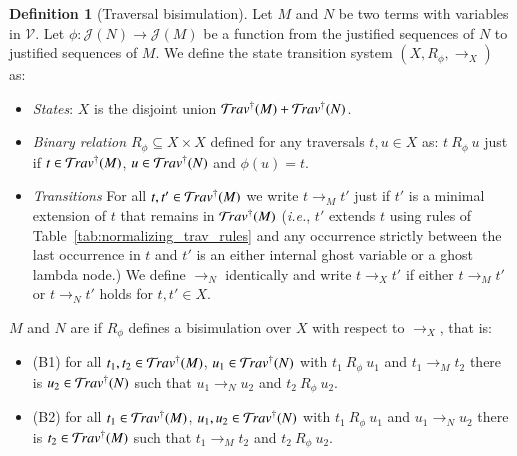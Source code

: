 \documentclass{elsarticle}
\makeatletter
\theoremstyle{plain}
\theoremstyle{definition}
\newtheorem{definition}{Definition}[section]
\theoremstyle{remark}
\renewcommand\ie{{\it i.e.\@\xspace}}
\def\justseqset{\mathcal{J}}
\makeatother
\begin{document}
\begin{definition}[Traversal bisimulation]
\label{def:bisimilar_terms}
Let $M$ and $N$ be two terms with variables in $\mathcal{V}$. Let $\phi\colon \justseqset(N) \rightarrow\justseqset(M)$ be a function from the justified sequences of $N$ to justified sequences of $M$. We define the state transition system $(X, R_\phi, \rightarrow_X)$ as:
\begin{itemize}[nosep]
    \item \emph{States}: $X$ is the disjoint union $\mathcal{T}\!rav^\dagger(M) + \mathcal{T}\!rav^\dagger(N)$.

    \item \emph{Binary relation $R_\phi\subseteq X \times X$} defined for any traversals $t, u \in X$ as:
    $ t~R_\phi~u$ just if $t\in\mathcal{T}\!rav^\dagger(M)$, $u\in\mathcal{T}\!rav^\dagger(N)$ and $\phi(u) = t$.

    \item \emph{Transitions} For all $t, t' \in \mathcal{T}\!rav^\dagger(M)$ we write $t \rightarrow_M t'$ just if $t'$ is a minimal extension of $t$ that remains in $\mathcal{T}\!rav^\dagger(M)$ (\ie, $t'$ extends $t$ using rules of Table~\ref{tab:normalizing_trav_rules} and any occurrence strictly between the last occurrence in $t$ and $t'$ is an either internal ghost variable or a ghost lambda node.) We define $\rightarrow_N$  identically and write $t \rightarrow_X t'$ if either $t \rightarrow_M t'$ or $t \rightarrow_N t'$ holds for $t, t' \in X$.
\end{itemize}

$M$ and $N$ are  if $R_\phi$ defines a bisimulation over $X$ with respect to $\rightarrow_X$, that is:
\begin{itemize}[nosep]
    \item (B1) for all $t_1, t_2 \in \mathcal{T}\!rav^\dagger(M)$, $u_1 \in \mathcal{T}\!rav^\dagger(N)$ with $t_1~R_\phi~u_1$ and $t_1 \rightarrow_M t_2$ there is $u_2 \in \mathcal{T}\!rav^\dagger(N)$ such that $u_1 \rightarrow_N u_2$ and $t_2~R_\phi~u_2$.
    \item (B2) for all $t_1 \in \mathcal{T}\!rav^\dagger(M)$, $u_1, u_2 \in \mathcal{T}\!rav^\dagger(N)$ with $t_1~R_\phi~u_1$ and $u_1 \rightarrow_N u_2$ there is $t_2 \in \mathcal{T}\!rav^\dagger(M)$ such that $t_1 \rightarrow_M t_2$ and $t_2~R_\phi~u_2$.
\end{itemize}
\end{definition}
\end{document}
